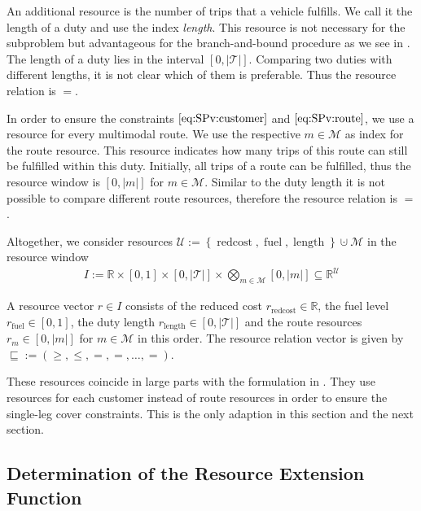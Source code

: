 An additional resource is the number of trips that a vehicle fulfills. We call it the length of a duty and use the index \emph{length}. This resource is not necessary for the subproblem but advantageous for the branch-and-bound procedure as we see in . The length of a duty lies in the interval $[0,|\mathcal{T}|]$. Comparing two duties with different lengths, it is not clear which of them is preferable. Thus the resource relation is $=$.

In order to ensure the constraints $\eqref{eq:SPv:customer}$ and $\eqref{eq:SPv:route}$, we use a resource for every multimodal route. We use the respective $m\in\mathcal{M}$ as index for the route resource. This resource indicates how many trips of this route can still be fulfilled within this duty. Initially, all trips of a route can be fulfilled, thus the resource window is $[0,|m|]$ for $m\in\mathcal{M}$. Similar to the duty length it is not possible to compare different route resources, therefore the resource relation is $=$.

Altogether, we consider resources ${\mathcal{U} := \left\{\operatorname{redcost},\operatorname{fuel},\operatorname{length}\right\}\cupdot\mathcal{M}}$ in the resource window
\begin{align*}
	I := \mathbb{R}\times[0,1]\times[0,|\mathcal{T}|]\times\bigotimes_{m\in\mathcal{M}}[0,|m|]\subseteq\mathbb{R}^{\mathcal{U}}
\end{align*}

A resource vector $r\in I$ consists of the reduced cost ${r_{\operatorname{redcost}}\in\mathbb{R}}$, the fuel level ${r_{\operatorname{fuel}}\in[0,1]}$, the duty length ${r_{\operatorname{length}}\in[0,|\mathcal{T}|]}$ and the route resources ${r_m\in[0,|m|]}$ for $m\in\mathcal{M}$ in this order. The resource relation vector is given by ${\sqsubseteq := \left(\geq,\leq,=,=,\dots,=\right)}$.

These resources coincide in large parts with the formulation in \cite{Kaiser}. They use resources for each customer instead of route resources in order to ensure the single-leg cover constraints. This is the only adaption in this section and the next section.


\subsection{Determination of the Resource Extension Function}
\label{sec:ref}

